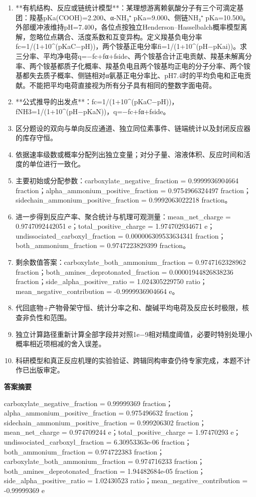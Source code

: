 \documentclass[UTF8,11pt,a4paper]{ctexart}
\begin{document}
\begin{enumerate}
\item **有机结构、反应或链统计模型**：某理想游离赖氨酸分子有三个可滴定基团：羧基pKa(COOH)=2.200、α-NH₃⁺ pKa=9.000、侧链NH₃⁺ pKa=10.500。外部缓冲液维持pH=7.400，各位点按独立Henderson–Hasselbalch概率模型离解，忽略位点耦合、活度系数和互变异构。定义羧基负电分率fc=1/(1+10\textasciicircum{}(pKaC−pH))，两个铵基正电分率fi=1/(1+10\textasciicircum{}(pH−pKai))。求三分率、平均净电荷q=−fc+fα+fside、两个铵基合计正电贡献、羧基未解离分率、两个铵基都质子化概率、羧基负电且两个铵基均正电的分子分率、两个铵基都失去质子概率、侧链相对α氨基正电分率比、pH7.4时的平均负电和正电贡献。不能把平均电荷直接视为所有分子具有相同的整数字面电荷。
\item **公式推导的出发点**：fc=1/(1+10\textasciicircum{}(pKaC−pH))，fNH3=1/(1+10\textasciicircum{}(pH−pKaN))，q=−fc+fα+fside。
\item 区分题设的双向与单向反应通道、独立同位素事件、链端统计以及封闭反应器的库存守恒。
\item 依据速率级数或概率分配列出独立变量；对分子量、溶液体积、反应时间和活度的单位进行一致化。
\item 主要初始或分配参数：carboxylate\_negative\_fraction = 0.9999936904664 fraction；alpha\_ammonium\_positive\_fraction = 0.9754966324497 fraction；sidechain\_ammonium\_positive\_fraction = 0.9992063022218 fraction。
\item 进一步得到反应产率、聚合统计与机理可观测量：mean\_net\_charge = 0.9747092442051 e；total\_positive\_charge = 1.974702934671 e；undissociated\_carboxyl\_fraction = 0.000006309533634341 fraction；both\_ammonium\_fraction = 0.9747223829399 fraction。
\item 剩余数值答案：carboxylate\_both\_ammonium\_fraction = 0.9747162328962 fraction；both\_amines\_deprotonated\_fraction = 0.00001944826838236 fraction；side\_alpha\_positive\_ratio = 1.024305229750 ratio；mean\_negative\_contribution = -0.9999936904664 e。
\item 代回底物+产物骨架守恒、统计分率之和、酸碱平均电荷及反应长时极限，核查非负性和范围。
\item 独立计算路径重新计算全部字段并对照1e−9相对精度阈值，必要时特别处理小概率相近项相减的舍入误差。
\item 科研模型和真正反应机理的实验验证、跨辑同构审查仍待专家完成，本题不计作已出版审定。
\end{enumerate}
\noindent\textbf{答案摘要}\par
carboxylate\_negative\_fraction = 0.99999369 fraction；alpha\_ammonium\_positive\_fraction = 0.975496632 fraction；sidechain\_ammonium\_positive\_fraction = 0.999206302 fraction；mean\_net\_charge = 0.974709244 e；total\_positive\_charge = 1.97470293 e；undissociated\_carboxyl\_fraction = 6.30953363e-06 fraction；both\_ammonium\_fraction = 0.974722383 fraction；carboxylate\_both\_ammonium\_fraction = 0.974716233 fraction；both\_amines\_deprotonated\_fraction = 1.94482684e-05 fraction；side\_alpha\_positive\_ratio = 1.02430523 ratio；mean\_negative\_contribution = -0.99999369 e\par
\end{document}
